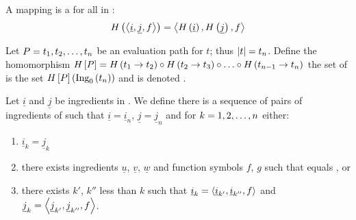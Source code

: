 \begin{defi}[Homorphism]
A mapping  is a  \iffTx{} for all  in :
\begin{equation}
H\left(\left\langle \underline{i},\underline{j},f\right\rangle\right) = \left\langle H\left(\underline{i}\right),H\left(\underline{j}\right),f\right\rangle
\end{equation}
\cite{conf/ijcai/Geiser75}
\end{defi}

\begin{defi}
Let $P=t_1,t_2,\ldots,t_n$ be an evaluation path for $t$; thus $\left|t\right|=t_n$. Define the homomorphism $H\left[P\right]=H\left(t_1\rightarrow t_2\right)\circ H\left(t_2\rightarrow t_3\right)\circ\ldots\circ H\left(t_{n-1}\rightarrow t_n\right)$ the set of  is the set $H\left[P\right]\left(\mbox{Ing}_0\left(t_n\right)\right)$ and is denoted .
\cite{conf/ijcai/Geiser75}
\end{defi}

\begin{defi}
Let $\underline{i}$ and $\underline{j}$ be ingredients in . We define  \iffTx{} there is a sequence of pairs  of ingredients of  such that $\underline{i}=\underline{i}_n$, $\underline{j}=\underline{j}_n$ and for $k=1,2,\ldots,n$ either:
\begin{enumerate}
 \item $\underline{i}_k=\underline{j}_k$
 \item there exists ingredients $\underline{u}$, $\underline{v}$, $\underline{w}$ and function symbols $f$, $g$ such that  equals , or
 \item there exists $k'$, $k''$ less than $k$ such that $\underline{i}_k=\left\langle \underline{i}_{k'},\underline{i}_{k''},f\right\rangle$ and $\underline{j}_k=\left\langle \underline{j}_{k'},\underline{j}_{k''},f\right\rangle$.
\end{enumerate}
\cite{conf/ijcai/Geiser75}
\end{defi}

